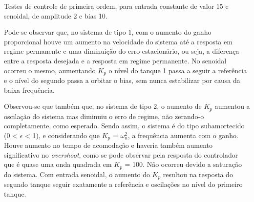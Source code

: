 Testes de controle de primeira ordem, para entrada constante de valor 15 e senoidal, de amplitude 2 e bias 10.

Pode-se observar que, no sistema de tipo 1, com o aumento do ganho proporcional houve um
aumento na velocidade do sistema até a resposta em regime permanente e
uma diminuição do erro estacionário, ou seja,
a diferença entre a resposta desejada e a resposta em regime permanente. No senoidal ocorreu o mesmo, aumentando $K_p$ o nível do tanque 1 passa a seguir a referência e o nível do segundo passa a orbitar o bias, sem nunca estabilizar por causa da baixa frequência.

Observou-se que também que, no sistema de tipo 2,
o aumento de $K_p$ aumentou a oscilação do sistema mas diminuiu o 
erro de regime, não zerando-o completamente, como esperado. Sendo assim,
o sistema é do tipo subamortecido (0 < $\epsilon$ < 1), e considerando
que $K_p$ = $\omega_n^2$, a frequência aumenta com o ganho. Houve aumento
no tempo de acomodação e haveria também aumento significativo no
\emph{overshoot}, como se pode observar pela resposta do controlador
que é quase uma onda quadrada em $K_p$ = 100.
Não ocorreu devido a saturação do sistema. Com entrada senoidal, o aumento do $K_p$ resultou na resposta do segundo tanque seguir exatamente a referência e oscilações no nível do primeiro tanque.